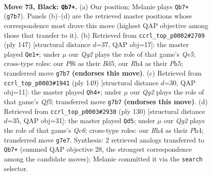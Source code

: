 \documentclass[11pt]{article}
\begin{document}
\clearpage

\begin{figure}[p]\centering
\begin{subfigure}{0.46\textwidth}\centering
\resizebox{\linewidth}{!}{%
\newchessgame
\chessboard[
  setfen={8/6qk/5p2/Q7/7r/6P1/6KP/8 b - - 2 73},
  showmover=false,
  pgfstyle=straightmove, color=movearrow, markmove={g7-b7}
]}
\caption{}
\end{subfigure}\hfill
\begin{subfigure}{0.46\textwidth}\centering
\resizebox{\linewidth}{!}{%
\newchessgame
\chessboard[
  setfen={8/8/3B4/3b3p/k3q3/7P/1Q4P1/7K b - - 3 74},
  showmover=false,
  pgfstyle=straightmove, color=movearrow, markmove={e4-e1}
]}
\caption{}
\end{subfigure}
\\[4pt]
\begin{subfigure}{0.46\textwidth}\centering
\resizebox{\linewidth}{!}{%
\newchessgame
\chessboard[
  setfen={8/3Q4/7k/7P/p4q2/5P2/5K2/8 b - - 6 75},
  showmover=false,
  pgfstyle=straightmove, color=movearrow, markmove={f4-h4}
]}
\caption{}
\end{subfigure}\hfill
\begin{subfigure}{0.46\textwidth}\centering
\resizebox{\linewidth}{!}{%
\newchessgame
\chessboard[
  setfen={8/3K4/2Q3pk/5p2/P6P/5P2/1q6/8 w - - 10 66},
  showmover=false,
  pgfstyle=straightmove, color=movearrow, markmove={c6-d5}
]}
\caption{}
\end{subfigure}
\caption{\textbf{Move 73, Black: \texttt{Qb7+}.} (a) Our position; Melanie plays \texttt{Qb7+} (\texttt{g7b7}). Panels (b)--(d) are the retrieved master positions whose correspondence most drove this move (highest QAP objective among those that transfer to it). (b) Retrieved from \texttt{ccrl\_top\_p0002\#2709} (ply 147) [structural distance $d$=37, QAP obj=17]: the master played \texttt{Qe1+}; under $\mu$ our \emph{Qg2} plays the role of that game's \emph{Qe5}; cross-type roles: our \emph{P}f6 as their \emph{B}d5, our \emph{R}h4 as their \emph{P}h5; transferred move \texttt{g7b7} \textbf{(endorses this move)}. (c) Retrieved from \texttt{ccrl\_top\_p0003\#1941} (ply 149) [structural distance $d$=30, QAP obj=11]: the master played \texttt{Qh4+}; under $\mu$ our \emph{Qg2} plays the role of that game's \emph{Qf5}; transferred move \texttt{g7b7} \textbf{(endorses this move)}. (d) Retrieved from \texttt{ccrl\_top\_p0003\#2930} (ply 130) [structural distance $d$=35, QAP obj=31]: the master played \texttt{Qd5}; under $\mu$ our \emph{Qg2} plays the role of that game's \emph{Qc6}; cross-type roles: our \emph{R}h4 as their \emph{P}h4; transferred move \texttt{g7e7}. Synthesis: 2 retrieved analogs transferred to \texttt{Qb7+} (summed QAP objective 28, the strongest correspondence among the candidate moves); Melanie committed it via the \texttt{search} selector.}
\label{fig:thought-m145}
\end{figure}
\end{document}
